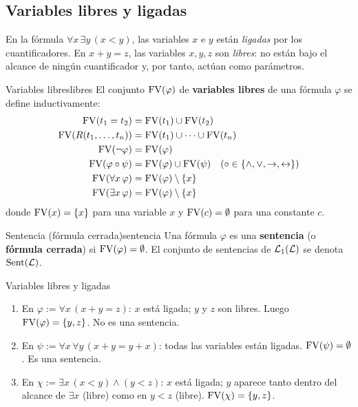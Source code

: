 \subsection{Variables libres y ligadas}

En la fórmula $\forall x\, \exists y\, (x < y)$, las variables $x$ e $y$ están \emph{ligadas} por los cuantificadores. En $x + y = z$, las variables $x, y, z$ son \emph{libres}: no están bajo el alcance de ningún cuantificador y, por tanto, actúan como parámetros.

\begin{definicion}{Variables libres}{libres}
El conjunto $\mathrm{FV}(\varphi)$ de \textbf{variables libres} de una fórmula $\varphi$ se define inductivamente:
\begin{align*}
  \mathrm{FV}(t_1 = t_2) &= \mathrm{FV}(t_1) \cup \mathrm{FV}(t_2) \\
  \mathrm{FV}(R(t_1,\ldots,t_n)) &= \mathrm{FV}(t_1) \cup \cdots \cup \mathrm{FV}(t_n) \\
  \mathrm{FV}(\neg\varphi) &= \mathrm{FV}(\varphi) \\
  \mathrm{FV}(\varphi \circ \psi) &= \mathrm{FV}(\varphi) \cup \mathrm{FV}(\psi) \quad (\circ \in \{\wedge, \vee, \to, \leftrightarrow\})\\
  \mathrm{FV}(\forall x\, \varphi) &= \mathrm{FV}(\varphi) \setminus \{x\} \\
  \mathrm{FV}(\exists x\, \varphi) &= \mathrm{FV}(\varphi) \setminus \{x\}
\end{align*}
donde $\mathrm{FV}(x) = \{x\}$ para una variable $x$ y $\mathrm{FV}(c) = \emptyset$ para una constante $c$.
\end{definicion}

\begin{definicion}{Sentencia (fórmula cerrada)}{sentencia}
Una fórmula $\varphi$ es una \textbf{sentencia} (o \textbf{fórmula cerrada}) si $\mathrm{FV}(\varphi) = \emptyset$. El conjunto de sentencias de $\mathcal{L}_1(\mathcal{L})$ se denota $\mathrm{Sent}(\mathcal{L})$.
\end{definicion}

\begin{ejemplo}{Variables libres y ligadas}{}
\begin{enumerate}[leftmargin=2em, label=(\alph*)]
  \item En $\varphi := \forall x\, (x + y = z)$: $x$ está ligada; $y$ y $z$ son libres. Luego $\mathrm{FV}(\varphi) = \{y, z\}$. No es una sentencia.
  \item En $\psi := \forall x\, \forall y\, (x + y = y + x)$: todas las variables están ligadas. $\mathrm{FV}(\psi) = \emptyset$. Es una sentencia.
  \item En $\chi := \exists x\, (x < y) \wedge (y < z)$: $x$ está ligada; $y$ aparece tanto dentro del alcance de $\exists x$ (libre) como en $y < z$ (libre). $\mathrm{FV}(\chi) = \{y, z\}$.
\end{enumerate}
\end{ejemplo}

